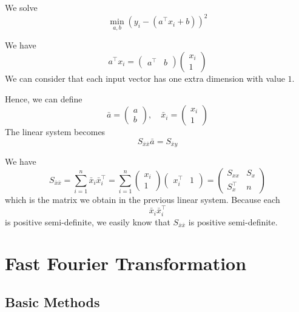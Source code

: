 \begin{recall}
    We solve \[
        \min_{a,b} (y_i - (a^\top x_i + b))^2
    \]
\end{recall}

We have \[
    a^\top x_i = \begin{pmatrix}
        a^\top & b
    \end{pmatrix} \begin{pmatrix}
        x_i \\ 1
    \end{pmatrix}
\]
We can consider that each input vector has one extra dimension with value $1$.


Hence, we can define \[
    \bar{a} = \begin{pmatrix}
        a \\ b
    \end{pmatrix}, \quad \bar{x}_i = \begin{pmatrix}
        x_i \\ 1
    \end{pmatrix}
\]
The linear system becomes \begin{equation*}
    S_{\bar{x}\bar{x}} \bar{a} = S_{\bar{x}y}
\end{equation*}

We have \[
    S_{\bar{x}\bar{x}} = \sum_{i=1}^n \bar{x}_i \bar{x}_i^\top = \sum_{i=1}^n \begin{pmatrix}
        x_i \\ 1
    \end{pmatrix} \begin{pmatrix} 
        x_i^\top & 1
    \end{pmatrix} = \begin{pmatrix}
        S_{xx} & S_x \\
        S_x^\top & n
    \end{pmatrix}
\]
which is the matrix we obtain in the previous linear system. Because each \[
    \bar{x}_i \bar{x}_i^\top
\]
is positive semi-definite, we easily know that $S_{\bar{x}\bar{x}}$ is positive semi-definite.


\chapter{Fast Fourier Transformation}

\section{Basic Methods}

